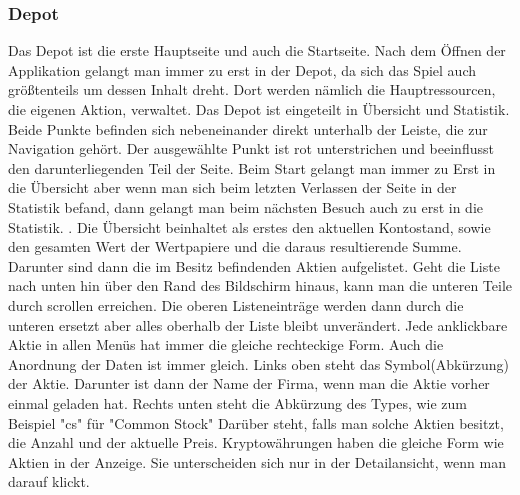 \documentclass[10pt]{scrartcl}
\begin{document}
\subsubsection{Depot}
Das Depot ist die erste Hauptseite und auch die Startseite. Nach dem Öffnen der Applikation gelangt man immer zu erst in der Depot, da sich das Spiel auch größtenteils um dessen Inhalt dreht. Dort werden nämlich die Hauptressourcen, die eigenen Aktion, verwaltet.
Das Depot ist eingeteilt in Übersicht und Statistik. Beide Punkte befinden sich nebeneinander direkt unterhalb der Leiste, die zur Navigation gehört. Der ausgewählte Punkt ist rot unterstrichen und beeinflusst den darunterliegenden Teil der Seite. Beim Start gelangt man immer zu Erst in die Übersicht aber wenn man sich beim letzten Verlassen der Seite in der Statistik befand, dann gelangt man beim nächsten Besuch auch zu erst in die Statistik. .
Die Übersicht beinhaltet als erstes den aktuellen Kontostand, sowie den gesamten Wert der Wertpapiere und die daraus resultierende Summe. Darunter sind dann die im Besitz befindenden Aktien aufgelistet. Geht die Liste nach unten hin über den Rand des Bildschirm hinaus, kann man die unteren Teile durch scrollen erreichen. Die oberen Listeneinträge werden dann durch die unteren ersetzt aber alles oberhalb der Liste bleibt unverändert.
Jede anklickbare Aktie in allen Menüs hat immer die gleiche rechteckige Form. Auch die Anordnung der Daten ist immer gleich. Links oben steht das Symbol(Abkürzung) der Aktie. Darunter ist dann der Name der Firma, wenn man die Aktie vorher einmal geladen hat. Rechts unten steht die Abkürzung des Types, wie zum Beispiel "cs" für "Common Stock" Darüber steht, falls man solche Aktien besitzt, die Anzahl und der aktuelle Preis.
Kryptowährungen haben die gleiche Form wie Aktien in der Anzeige. Sie unterscheiden sich nur in der Detailansicht, wenn man darauf klickt.

	


\end{document}
